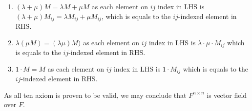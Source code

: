 \documentclass[11pt]{article}
\begin{document}
\begin{enumerate}
    \item $(\lambda + \mu) M = \lambda M + \mu M$ as each element on $ij$ index in LHS is $(\lambda + \mu) M_{ij} =\lambda M_{ij} + \mu M_{ij}$, which is equals to the $ij$-indexed element in RHS.
    \item $\lambda (\mu M) = (\lambda \mu) M)$ as each element on $ij$ index in LHS is $\lambda \cdot \mu \cdot  M_{ij}$ which is equals to the $ij$-indexed element in RHS.
    \item $1 \cdot M = M$  as each element on $ij$ index in LHS is $1 \cdot M_{ij}$ which is equals to the $ij$-indexed element in RHS.
\end{enumerate}\newline

As all ten axiom is proven to be valid, we may conclude that $F^{n \times n}$ is vector field over $F$.
\end{document}
